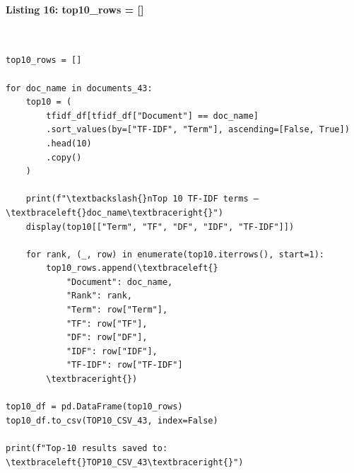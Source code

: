 \documentclass[12pt,a4paper,oneside]{report}
\begin{document}
\paragraph{Listing 16: top10\_rows = []}\mbox{}\\[-1ex]
\begin{Verbatim}[commandchars=\\\{\},breaklines=true,breakanywhere=true,fontsize=\scriptsize,frame=leftline,framesep=2mm,rulecolor=\color{gray}]
top10_rows = []

for doc_name in documents_43:
    top10 = (
        tfidf_df[tfidf_df["Document"] == doc_name]
        .sort_values(by=["TF-IDF", "Term"], ascending=[False, True])
        .head(10)
        .copy()
    )

    print(f"\textbackslash{}nTop 10 TF-IDF terms — \textbraceleft{}doc_name\textbraceright{}")
    display(top10[["Term", "TF", "DF", "IDF", "TF-IDF"]])

    for rank, (_, row) in enumerate(top10.iterrows(), start=1):
        top10_rows.append(\textbraceleft{}
            "Document": doc_name,
            "Rank": rank,
            "Term": row["Term"],
            "TF": row["TF"],
            "DF": row["DF"],
            "IDF": row["IDF"],
            "TF-IDF": row["TF-IDF"]
        \textbraceright{})

top10_df = pd.DataFrame(top10_rows)
top10_df.to_csv(TOP10_CSV_43, index=False)

print(f"Top-10 results saved to: \textbraceleft{}TOP10_CSV_43\textbraceright{}")
\end{Verbatim}
\end{document}
